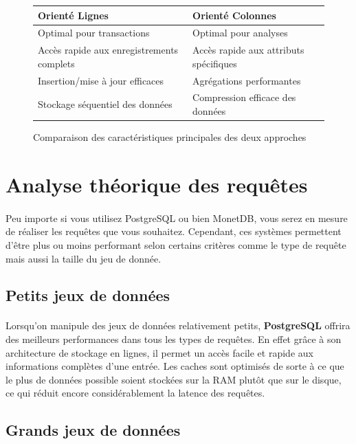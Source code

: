 \documentclass[11pt]{extarticle}
\begin{document}
\begin{figure}[H]
    \centering
    \begin{tabular}{|p{}|p{}|}
    \hline
    \textbf{Orienté Lignes} & \textbf{Orienté Colonnes} \\
    \hline
    Optimal pour transactions & Optimal pour analyses \\
    Accès rapide aux enregistrements complets & Accès rapide aux attributs spécifiques \\
    Insertion/mise à jour efficaces & Agrégations performantes \\
    Stockage séquentiel des données & Compression efficace des données \\
    \hline
    \end{tabular}
    \caption{Comparaison des caractéristiques principales des deux approches}
    \label{tab:comparison}
\end{figure}

\section{Analyse théorique des requêtes}
\paragraph{}
Peu importe si vous utilisez PostgreSQL ou bien MonetDB, vous serez en mesure de réaliser les requêtes que vous souhaitez. Cependant, ces systèmes permettent d'être plus ou moins performant selon certains critères comme le type de requête mais aussi la taille du jeu de donnée.

\subsection{Petits jeux de données}
\paragraph{}
 Lorsqu'on manipule des jeux de données relativement petits, \textbf{PostgreSQL} offrira des meilleurs performances dans tous les types de requêtes. En effet grâce à son architecture de stockage en lignes, il permet un accès facile et rapide aux informations complètes d'une entrée. Les caches sont optimisés de sorte à ce que le plus de données possible soient stockées sur la RAM plutôt que sur le disque, ce qui réduit encore considérablement la latence des requêtes.

\subsection{Grands jeux de données}
\end{document}
